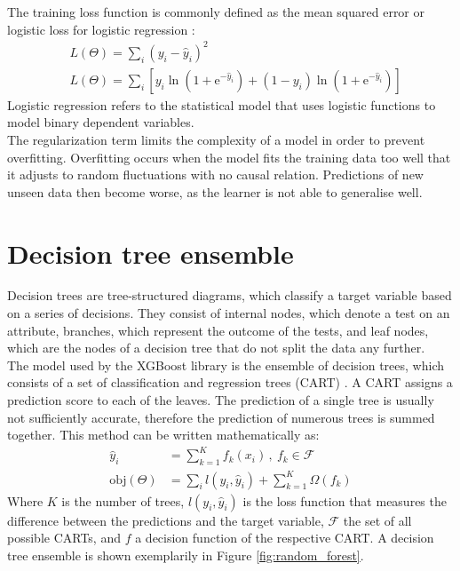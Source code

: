 The training loss function is commonly defined as the mean squared error or logistic loss for logistic regression \cite{logistic}:
\begin{align}
  &L(\Theta) = \sum_i (y_i - \hat{y}_i)^2 \\
  &L(\Theta) = \sum_i [y_i \ln{(1 + \text{e}^{-\hat{y}_i})} + (1 - y_i) \ln{(1 + \text{e}^{-\hat{y}_i})}]
\end{align}
Logistic regression refers to the statistical model that uses logistic functions to model binary dependent variables. \\
The regularization term limits the complexity of a model in order to prevent overfitting. Overfitting occurs when the model fits the training data too well that it adjusts
to random fluctuations with no causal relation. Predictions of new unseen data then become worse, as the learner is not able to generalise well.

\section{Decision tree ensemble}
Decision trees are tree-structured diagrams, which classify a target variable based on a series of decisions. They consist of internal nodes, which denote
a test on an attribute, branches, which represent the outcome of the tests, and leaf nodes, which are the nodes of a decision tree that do not split the data any further. \\
The model used by the XGBoost library is the ensemble of decision trees, which consists of a set of classification and regression trees (CART) \cite{cart}.
A CART assigns a prediction score to each of the leaves.
The prediction of a single tree is usually not sufficiently accurate,
therefore the prediction of numerous trees is summed together. This method can be written mathematically as:
\begin{align}
  \hat{y}_i &= \sum_{k=1}^K f_k(x_i)\,, \: f_k \in \mathcal{F} \\
  \text{obj}(\Theta) &= \sum_i l(y_i, \hat{y}_i) + \sum_{k=1}^K \Omega(f_k)
\end{align}
Where $K$ is the number of trees, $l(y_i, \hat{y}_i)$ is the loss function that measures the difference between the predictions and the
target variable, $\mathcal{F}$ the set of all possible CARTs, and $f$ a decision function of the respective CART. A decision tree ensemble is shown exemplarily in
Figure \ref{fig:random_forest}.

